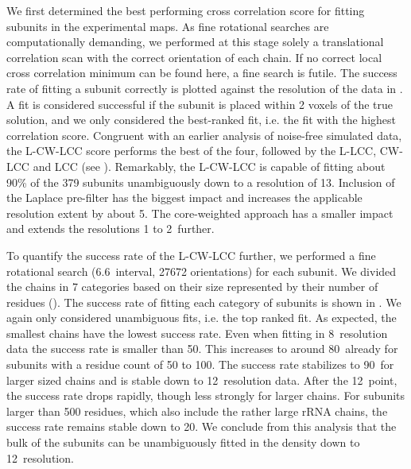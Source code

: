 

We first determined the best performing cross correlation score for fitting
subunits in the experimental maps. As fine rotational searches are
computationally demanding, we performed at this stage solely a translational
correlation scan with the correct orientation of each chain. If no correct
local cross correlation minimum can be found here, a fine search is futile. The
success rate of fitting a subunit correctly is plotted against the resolution
of the data in . A fit is considered successful if
the subunit is placed within 2 voxels of the true solution, and we only
considered the best-ranked fit, i.e. the fit with the highest correlation
score. Congruent with an earlier analysis of noise-free simulated data, the
L-CW-LCC score performs the best of the four, followed by the L-LCC, CW-LCC and
LCC (see ).  Remarkably, the L-CW-LCC is capable of
fitting about 90\% of the 379 subunits unambiguously down to a resolution of
13\Angstrom. Inclusion of the Laplace pre-filter has the biggest impact and
increases the applicable resolution extent by about 5\Angstrom. The
core-weighted approach has a smaller impact and extends the resolutions 1 to
2\Angstrom\ further. 

{}



To quantify the success rate of the L-CW-LCC further, we performed a fine
rotational search (6.6\Deg\ interval, 27672 orientations) for each subunit.  We
divided the chains in 7 categories based on their size represented by their
number of residues (). The success rate of fitting
each category of subunits is shown in . We again
only considered unambiguous fits, i.e.  the top ranked fit. As expected, the
smallest chains have the lowest success rate. Even when fitting in 8\Angstrom\
resolution data the success rate is smaller than 50\percent. This increases to
around 80\percent\ already for subunits with a residue count of 50 to 100. The
success rate stabilizes to 90\percent\ for larger sized chains and is stable
down to 12\Angstrom\ resolution data. After the 12\Angstrom\ point, the success
rate drops rapidly, though less strongly for larger chains. For subunits larger
than 500 residues, which also include the rather large rRNA chains, the success
rate remains stable down to 20\Angstrom.  We conclude from this analysis that
the bulk of the subunits can be unambiguously fitted in the density down to
12\Angstrom\ resolution. 

